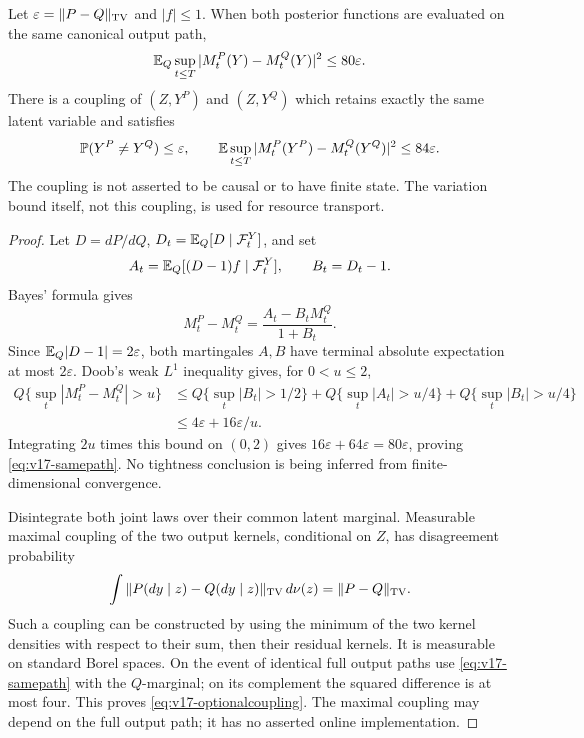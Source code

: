 \begin{theorem}
\label{thm:v17-optional}
Let $\varepsilon=\|P-Q\|_{\rm TV}$ and $|f|\le1$. When both
posterior functions are evaluated on the same canonical output path,
\begin{equation}\label{eq:v17-samepath}
 \mathbb E_Q\sup_{t\le T}|M^P_t(Y)-M^Q_t(Y)|^2\le80\varepsilon.
\end{equation}
There is a coupling of $(Z,Y^P)$ and $(Z,Y^Q)$ which retains exactly
the same latent variable and satisfies
\begin{equation}\label{eq:v17-optionalcoupling}
 \mathbb P(Y^P\ne Y^Q)\le\varepsilon,\qquad
 \mathbb E\sup_{t\le T}|M^P_t(Y^P)-M^Q_t(Y^Q)|^2
                                      \le84\varepsilon.
\end{equation}
The coupling is not asserted to be causal or to have finite state.
The variation bound itself, not this coupling, is used for resource
transport.
\end{theorem}
\begin{proof}
Let $D=dP/dQ$, $D_t=\mathbb E_Q[D\mid\mathcal F^Y_t]$, and set
\[
 A_t=\mathbb E_Q[(D-1)f\mid\mathcal F^Y_t],\qquad B_t=D_t-1.
\]
Bayes' formula gives
\[
 M^P_t-M^Q_t=\frac{A_t-B_tM^Q_t}{1+B_t}.
\]
Since $\mathbb E_Q|D-1|=2\varepsilon$, both martingales $A,B$ have
terminal absolute expectation at most $2\varepsilon$. Doob's weak
$L^1$ inequality gives, for $0<u\le2$,
\begin{align*}
 Q\{\sup_t|M^P_t-M^Q_t|>u\}
 &\le Q\{\sup_t|B_t|>1/2\}
       +Q\{\sup_t|A_t|>u/4\}+Q\{\sup_t|B_t|>u/4\}\\
 &\le4\varepsilon+16\varepsilon/u.
\end{align*}
Integrating $2u$ times this bound on $(0,2)$ gives
$16\varepsilon+64\varepsilon=80\varepsilon$, proving
\eqref{eq:v17-samepath}. No tightness conclusion is being inferred
from finite-dimensional convergence.

Disintegrate both joint laws over their common latent marginal.
Measurable maximal coupling of the two output kernels, conditional on
$Z$, has disagreement probability
\[
 \int\|P(dy\mid z)-Q(dy\mid z)\|_{\rm TV}\,d\nu(z)
 =\|P-Q\|_{\rm TV}.
\]
Such a coupling can be constructed by using the minimum of the two
kernel densities with respect to their sum, then their residual
kernels. It is measurable on standard Borel spaces. On the event of
identical full output paths use \eqref{eq:v17-samepath} with the
$Q$-marginal; on its complement the squared difference is at most
four. This proves \eqref{eq:v17-optionalcoupling}. The maximal coupling
may depend on the full output path; it has no asserted online
implementation.
\end{proof}

